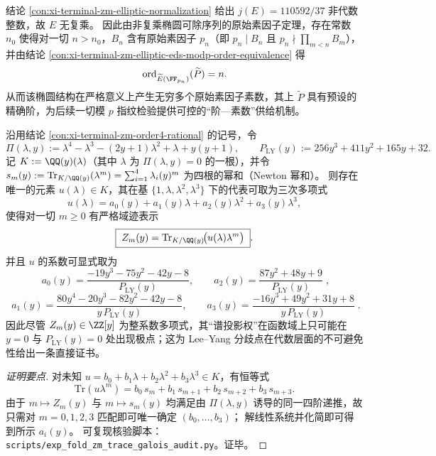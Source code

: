 

\begin{conclusion}\label{con:xi-terminal-zm-elliptic-eds-primitive-primes-noncm}
结论 \ref{con:xi-terminal-zm-elliptic-normalization} 给出
\(
j(E)=110592/37
\)
非代数整数，故 \(E\) 无复乘。
因此由非复乘椭圆可除序列的原始素因子定理，存在常数 \(n_0\) 使得对一切 \(n>n_0\)，\(B_n\) 含有原始素因子 \(p_n\)（即 \(p_n\mid B_n\) 且 \(p_n\nmid\prod_{m<n}B_m\)），并由结论 \ref{con:xi-terminal-zm-elliptic-eds-modp-order-equivalence} 得
\[
\mathrm{ord}_{\widetilde E(\FF_{p_n})}(\widetilde P)=n.
\]
从而该椭圆结构在严格意义上产生无穷多个原始素因子素数，其上 \(\widetilde P\) 具有预设的精确阶，为后续一切模 \(p\) 指纹检验提供可控的“阶—素数”供给机制。
\end{conclusion}

\begin{conclusion}\label{con:xi-terminal-zm-field-trace-representation}
沿用结论 \ref{con:xi-terminal-zm-order4-rational} 的记号，令
\[
\Pi(\lambda,y):=\lambda^4-\lambda^3-(2y+1)\lambda^2+\lambda+y(y+1),
\qquad
P_{\mathrm{LY}}(y):=256y^3+411y^2+165y+32.
\]
记 \(K:=\QQ(y)(\lambda)\)（其中 \(\lambda\) 为 \(\Pi(\lambda,y)=0\) 的一根），并令
\(
s_m(y):=\mathrm{Tr}_{K/\QQ(y)}(\lambda^m)
=\sum_{i=1}^{4}\lambda_i(y)^m
\)
为四根的幂和（Newton 幂和）。
则存在唯一的元素 \(u(\lambda)\in K\)，其在基 \(\{1,\lambda,\lambda^2,\lambda^3\}\) 下的代表可取为三次多项式
\[
u(\lambda)=a_0(y)+a_1(y)\lambda+a_2(y)\lambda^2+a_3(y)\lambda^3,
\]
使得对一切 \(m\ge 0\) 有严格域迹表示
\[
\boxed{\;
Z_m(y)=\mathrm{Tr}_{K/\QQ(y)}\!\bigl(u(\lambda)\lambda^m\bigr)\; }.
\]
并且 \(u\) 的系数可显式取为
\[
\boxed{\;
a_0(y)=\frac{-19y^3-75y^2-42y-8}{P_{\mathrm{LY}}(y)},\qquad
a_2(y)=\frac{87y^2+48y+9}{P_{\mathrm{LY}}(y)}\; } ,
\]
\[
\boxed{\;
a_1(y)=\frac{80y^4-20y^3-82y^2-42y-8}{y\,P_{\mathrm{LY}}(y)},\qquad
a_3(y)=\frac{-16y^3+49y^2+31y+8}{y\,P_{\mathrm{LY}}(y)}\; } .
\]
因此尽管 \(Z_m(y)\in\ZZ[y]\) 为整系数多项式，其“谱投影权”在函数域上只可能在
\(
y=0
\)
与
\(
P_{\mathrm{LY}}(y)=0
\)
处出现极点；这为 Lee--Yang 分歧点在代数层面的不可避免性给出一条直接证书。
\end{conclusion}
\begin{proof}[证明要点]
对未知 \(u=b_0+b_1\lambda+b_2\lambda^2+b_3\lambda^3\in K\)，有恒等式
\[
\mathrm{Tr}(u\lambda^m)=b_0\,s_m+b_1\,s_{m+1}+b_2\,s_{m+2}+b_3\,s_{m+3}.
\]
由于 \(m\mapsto Z_m(y)\) 与 \(m\mapsto s_m(y)\) 均满足由 \(\Pi(\lambda,y)\) 诱导的同一四阶递推，故只需对 \(m=0,1,2,3\) 匹配即可唯一确定 \((b_0,\dots,b_3)\)；
解线性系统并化简即可得到所示 \(a_i(y)\)。
可复现核验脚本：\texttt{scripts/exp\_fold\_zm\_trace\_galois\_audit.py}。证毕。
\end{proof}

